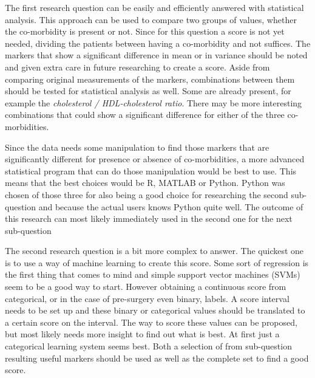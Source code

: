 \documentclass[10pt,a4paper]{article}
\begin{document}
	The first research question can be easily and efficiently answered with statistical analysis. This approach can be used to compare two groups of values, whether the co-morbidity is present or not. Since for this question a score is not yet needed, dividing the patients between having a co-morbidity and not suffices. The markers that show a significant difference in mean or in variance should be noted and given extra care in future researching to create a score. Aside from comparing original measurements of the markers, combinations between them should be tested for statistical analysis as well. Some are already present, for example the \textit{cholesterol / HDL-cholesterol ratio}. There may be more interesting combinations that could show a significant difference for either of the three co-morbidities.
	
	Since the data needs some manipulation to find those markers that are significantly different for presence or absence of co-morbidities, a more advanced statistical program that can do those manipulation would be best to use. This means that the best choices would be R, MATLAB or Python. Python was chosen of those three for also being a good choice for researching the second sub-question and because the actual users knows Python quite well. The outcome of this research can most likely immediately used in the second one for the next sub-question
	
	The second research question is a bit more complex to answer. The quickest one is to use a way of machine learning to create this score. Some sort of regression is the first thing that comes to mind and simple support vector machines (SVMs) seem to be a good way to start. However obtaining a continuous score from categorical, or in the case of pre-surgery even binary, labels. A score interval needs to be set up and these binary or categorical values should be translated to a certain score on the interval. The way to score these values can be proposed, but most likely needs more insight to find out what is best. At first just a categorical learning system seems best. Both a selection of from sub-question resulting useful markers should be used as well as the complete set to find a good score.
	
	
\end{document}
